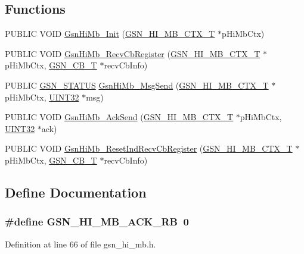 \subsection*{Functions}
\begin{DoxyCompactItemize}
\item 
PUBLIC VOID \hyperlink{a00506_a9a4eb6309fe4be38beab37b5cf0aa821}{GsnHiMb\_\-Init} (\hyperlink{a00089}{GSN\_\-HI\_\-MB\_\-CTX\_\-T} $\ast$pHiMbCtx)
\item 
PUBLIC VOID \hyperlink{a00506_a03f9024295120c5126240c6805072110}{GsnHiMb\_\-RecvCbRegister} (\hyperlink{a00089}{GSN\_\-HI\_\-MB\_\-CTX\_\-T} $\ast$pHiMbCtx, \hyperlink{a00036}{GSN\_\-CB\_\-T} $\ast$recvCbInfo)
\item 
PUBLIC \hyperlink{a00660_gada5951904ac6110b1fa95e51a9ddc217}{GSN\_\-STATUS} \hyperlink{a00506_a0e909527fe01746ee75a4e722aead6fc}{GsnHiMb\_\-MsgSend} (\hyperlink{a00089}{GSN\_\-HI\_\-MB\_\-CTX\_\-T} $\ast$pHiMbCtx, \hyperlink{a00660_gae1e6edbbc26d6fbc71a90190d0266018}{UINT32} $\ast$msg)
\item 
PUBLIC VOID \hyperlink{a00506_a1c7f86819310903ac1cc8053060bfdc3}{GsnHiMb\_\-AckSend} (\hyperlink{a00089}{GSN\_\-HI\_\-MB\_\-CTX\_\-T} $\ast$pHiMbCtx, \hyperlink{a00660_gae1e6edbbc26d6fbc71a90190d0266018}{UINT32} $\ast$ack)
\item 
PUBLIC VOID \hyperlink{a00506_a2726de7ef5da8d51f58253cde523d997}{GsnHiMb\_\-ResetIndRecvCbRegister} (\hyperlink{a00089}{GSN\_\-HI\_\-MB\_\-CTX\_\-T} $\ast$pHiMbCtx, \hyperlink{a00036}{GSN\_\-CB\_\-T} $\ast$recvCbInfo)
\end{DoxyCompactItemize}


\subsection{Define Documentation}
\hypertarget{a00506_a309981ae0389b7dfeac5a7cf8fdb4575}{
\subsubsection[{GSN\_\-HI\_\-MB\_\-ACK\_\-RB}]{\setlength{\rightskip}{0pt plus 5cm}\#define GSN\_\-HI\_\-MB\_\-ACK\_\-RB~0}}
\label{a00506_a309981ae0389b7dfeac5a7cf8fdb4575}


Definition at line 66 of file gsn\_\-hi\_\-mb.h.

